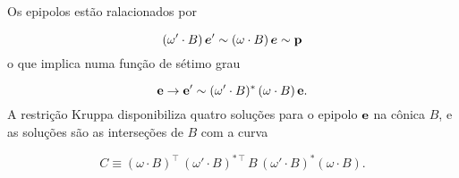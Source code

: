 \begin{teorema}
Os epipolos estão ralacionados por 

\begin{equation}\label{eq.equiv-reta-polar-sem-B}
(\omega'\cdot B)\,\boldsymbol{e}'\sim (\omega\cdot B)\,\boldsymbol{e}\sim{\bf p}
\end{equation}
o que implica numa função de sétimo grau 

\begin{equation}\label{eq.map-7-grau}
{\bf e} \rightarrow {\bf e'} \sim (\omega' \cdot B)^*\,(\omega \cdot B)\,{\bf e}.
\end{equation}
A restrição Kruppa disponibiliza quatro soluções para o epipolo ${\bf e}$ na cônica $B$, e as soluções são as interseções  de $B$ com a curva 

\begin{equation}\label{eq.definicao-conica-C}
C \equiv (\omega \cdot B)^\top\,(\omega' \cdot B)^{*\,\top}\,B\,(\omega' \cdot B)^*(\omega \cdot B).
\end{equation}

\end{teorema}

